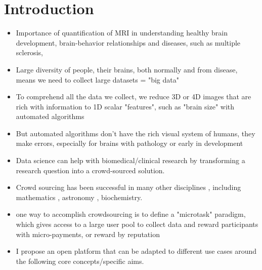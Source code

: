 \section{Introduction}
\begin{itemize}
\item Importance of quantification of MRI in understanding healthy brain development\cite{giedd1999brain}, brain-behavior relationships\cite{biswal2010toward} and diseases, such as multiple sclerosis\cite{bakshi2008mri}, 
\item Large diversity of people, their brains, both normally and from disease, means we need to collect large datasets = "big data"
\item To comprehend all the data we collect, we reduce 3D or 4D images that are rich with information to 1D scalar "features", such as "brain size" with automated algorithms
\item But automated algorithms don't have the rich visual system of humans, they make errors, especially for brains with pathology or early in development
\item Data science can help with biomedical/clinical research by transforming a research question into a crowd-sourced solution. 
\item Crowd sourcing has been successful in many other disciplines \cite{wiggins2011conservation}, including mathematics \cite{cranshaw2011polymath}, astronomy \cite{lintott2008galaxy}, biochemistry\cite{eiben2012increased}. 
\item one way to accomplish crowdsourcing is to define a "microtask" paradigm, which gives access to a large user pool to collect data and reward participants with micro-payments, or reward by reputation \cite{kittur2008crowdsourcing}
\item I propose an open platform that can be adapted to different use cases around the following core concepts/specific aims.
\end{itemize}

